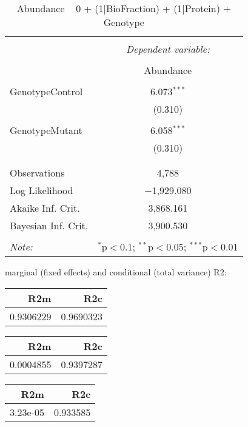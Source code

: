 \documentclass[11pt]{report}
\begin{document}
\begin{table}[!htbp] \centering 
  \caption{Abundance ~ 0 + (1|BioFraction) + (1|Protein) + Genotype} 
  \label{} 
\begin{tabular}{@{\extracolsep{5pt}}lc} 
\\[-1.8ex]\hline 
\hline \\[-1.8ex] 
 & \multicolumn{1}{c}{\textit{Dependent variable:}} \\ 
\cline{2-2} 
\\[-1.8ex] & Abundance \\ 
\hline \\[-1.8ex] 
 GenotypeControl & 6.073$^{***}$ \\ 
  & (0.310) \\ 
  & \\ 
 GenotypeMutant & 6.058$^{***}$ \\ 
  & (0.310) \\ 
  & \\ 
\hline \\[-1.8ex] 
Observations & 4,788 \\ 
Log Likelihood & $-$1,929.080 \\ 
Akaike Inf. Crit. & 3,868.161 \\ 
Bayesian Inf. Crit. & 3,900.530 \\ 
\hline 
\hline \\[-1.8ex] 
\textit{Note:}  & \multicolumn{1}{r}{$^{*}$p$<$0.1; $^{**}$p$<$0.05; $^{***}$p$<$0.01} \\ 
\end{tabular} 
\end{table} 
marginal (fixed effects) and conditional (total variance) R2:

\begin{tabular}{r|r}
\hline
R2m & R2c\\
\hline
0.9306229 & 0.9690323\\
\hline
\end{tabular}

\begin{tabular}{r|r}
\hline
R2m & R2c\\
\hline
0.0004855 & 0.9397287\\
\hline
\end{tabular}

\begin{tabular}{r|r}
\hline
R2m & R2c\\
\hline
3.23e-05 & 0.933585\\
\hline
\end{tabular}
\end{document}
